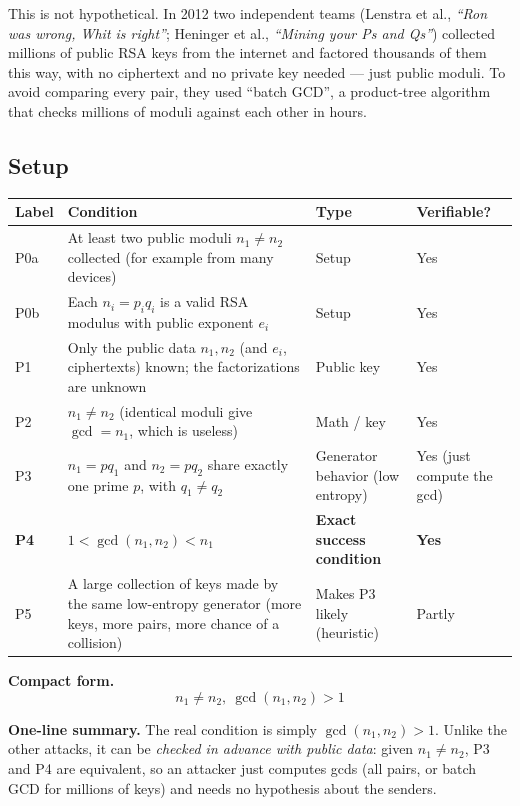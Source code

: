 \documentclass[11pt]{article}
\begin{document}
This is not hypothetical. In 2012 two independent teams (Lenstra et al., \emph{``Ron was wrong, Whit is right''}; Heninger et al., \emph{``Mining your Ps and Qs''}) collected millions of public RSA keys from the internet and factored thousands of them this way, with no ciphertext and no private key needed --- just public moduli. To avoid comparing every pair, they used ``batch GCD'', a product-tree algorithm that checks millions of moduli against each other in hours.

\subsection*{Setup}
\begin{center}
\begin{tabular}{@{}>{\raggedright\arraybackslash}p{1.1cm}>{\raggedright\arraybackslash}p{7.9cm}>{\raggedright\arraybackslash}p{3.4cm}>{\raggedright\arraybackslash}p{2.6cm}@{}}
\toprule
\textbf{Label} & \textbf{Condition} & \textbf{Type} & \textbf{Verifiable?} \\
\midrule
P0a & At least two public moduli $n_1\ne n_2$ collected (for example from many devices) & Setup & Yes \\
P0b & Each $n_i=p_iq_i$ is a valid RSA modulus with public exponent $e_i$ & Setup & Yes \\
P1 & Only the public data $n_1,n_2$ (and $e_i$, ciphertexts) known; the factorizations are unknown & Public key & Yes \\
P2 & $n_1\ne n_2$ (identical moduli give $\gcd=n_1$, which is useless) & Math / key & Yes \\
P3 & $n_1=pq_1$ and $n_2=pq_2$ share exactly one prime $p$, with $q_1\ne q_2$ & Generator behavior (low entropy) & Yes (just compute the gcd) \\
\textbf{P4} & \textbf{$1<\gcd(n_1,n_2)<n_1$} & \textbf{Exact success condition} & \textbf{Yes} \\
P5 & A large collection of keys made by the same low-entropy generator (more keys, more pairs, more chance of a collision) & Makes P3 likely (heuristic) & Partly \\
\bottomrule
\end{tabular}
\end{center}

\textbf{Compact form.}
\[
\boxed{\;n_1\ne n_2,\ \gcd(n_1,n_2)>1\;}
\]

\textbf{One-line summary.} The real condition is simply $\gcd(n_1,n_2)>1$. Unlike the other attacks, it can be \emph{checked in advance with public data}: given $n_1\ne n_2$, P3 and P4 are equivalent, so an attacker just computes gcds (all pairs, or batch GCD for millions of keys) and needs no hypothesis about the senders.
\end{document}

